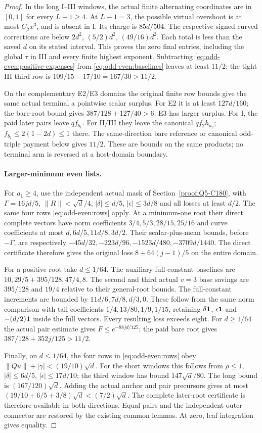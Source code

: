 \begin{proof}
In the long I--III windows, the actual finite alternating coordinates
are in $[0,1]$ for every $L-1\ge4$.
At $L-1=3$, the possible virtual overshoot is at most
$C_\beta x^3$, and is absent in I.
Its charge is $85d/504$.
The respective signed curved corrections are below
$2d^2$, $(5/2)d^2$, $(49/16)d^2$.
Each total is less than the saved $d$ on its stated interval.
This proves the zero final entries, including the global $\tau$
in III and every finite highest exponent.
Subtracting \eqref{eq:odd-even:positive-expenses} from
\eqref{eq:odd-even:baselines} leaves at least $11/2$;
the tight III third row is $109/15-17/10=167/30>11/2$.

On the complementary E2/E3 domains the original finite row bounds
give the same actual terminal a pointwise scalar surplus.
For E2 it is at least $127d/160$; the bare-root bound gives
$387/128+127/40>6$. E3 has larger surplus.
For I, the paid later pairs leave $qf_{b_1}$.
For II/III they leave the canonical $qf_2h_{a_2}$;
$f_{b_2}\le2(1-2d)\le1$ there.
The same-direction bare reference or canonical odd-triple payment
below gives $11/2$. These are bounds on the same products; no
terminal arm is reversed at a host-domain boundary.

\paragraph{Larger-minimum even lists.}
For $a_1\ge4$, use the independent actual mask of
Section~\ref{proof:Q5-C180}, with $\Gamma=16jd/5$,
$\|R\|<\sqrt d/4$, $|\delta|\le d/5$,
$|\epsilon|\le3d/8$ and all losses at least $d/2$.
The same four rows \eqref{eq:odd-even:rows} apply.
At a minimum-one root their direct complete vectors have norm
coefficients $3/4,5/3,28/15,25/16$ and curve coefficients
at most $d,6d/5,11d/8,3d/2$.
Their scalar-plus-mean bounds, before $-\Gamma$, are respectively
$-45d/32,-223d/96,-1523d/480,-3709d/1440$.
The direct certificate therefore gives the original loss
$8+64(j-1)/5$ on the entire domain.

For a positive root take $d\le1/64$.
The auxiliary full-constant baselines are
$10,29/5+395/128,47/4,8$.
The second and third actual $v=3$ base savings are $395/128$ and
$19/4$ relative to their general-root bounds.
The full-constant increments are bounded by
$11d/6,7d/8,d/3,0$.
These follow from the same norm comparison with tail coefficients
$1/4,13/80,1/9,1/15$, retaining $\delta\mathbf1$,
$\epsilon\mathbf1$ and $-(d/2)\mathbf1$ inside the full vectors.
Every resulting loss exceeds eight.
For $d\ge1/64$ the actual pair estimate gives
$F\le e^{-88jd/125}$; the paid bare root gives
$387/128+352j/125>11/2$.

Finally, on $d\le1/64$, the four rows in
\eqref{eq:odd-even:rows} obey
$\|Qu\|+|\gamma|<(19/10)\sqrt d$.
For the short windows this follows from
$\rho\le1$, $|\delta|\le6d/5$, $|\epsilon|\le17d/10$;
the third window has bound $147\sqrt d/80$.
The long bound is $(167/120)\sqrt d$.
Adding the actual anchor and pair precursors gives at most
$(19/10+6/5+3/8)\sqrt d<(7/2)\sqrt d$.
The complete later-root certificate is therefore available in
both directions. Equal pairs and the independent outer connector
are restored by the existing common lemmas. At zero, leaf
integration gives equality.
\end{proof}
